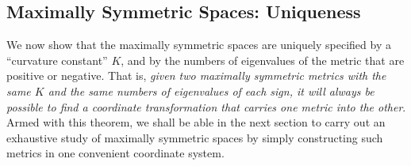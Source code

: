 
\subsection{Maximally Symmetric Spaces: Uniqueness}\label{sec:13.2}

We now show that the maximally symmetric spaces are uniquely specified by a
``curvature constant'' \(K\), and by the numbers of eigenvalues of the metric
that are positive or negative. That is, \emph{given two maximally symmetric
metrics with the same \(K\) and the same numbers of eigenvalues of each sign,
it will always be possible to find a coordinate transformation that carries
one metric into the other}. Armed with this theorem, we shall be able in the
next section to carry out an exhaustive study of maximally symmetric spaces by
simply constructing such metrics in one convenient coordinate system.

